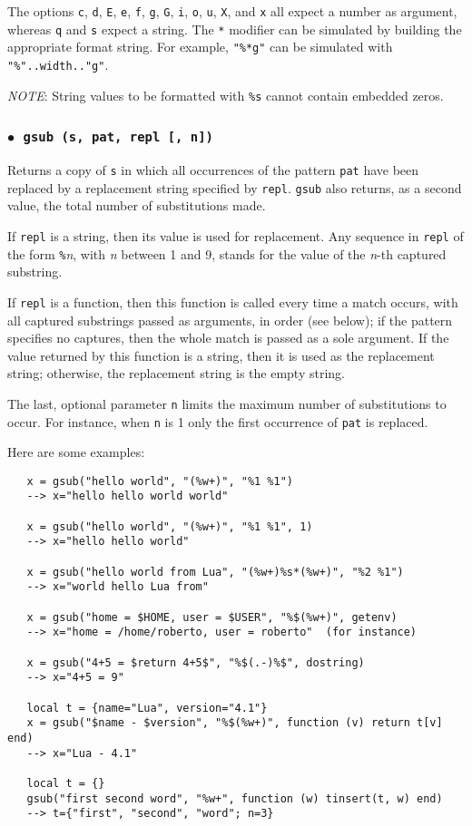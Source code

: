 \documentclass[11pt,twoside,draft]{article}
\makeatletter
\newcommand{\M}[1]{{\rm\emph{#1}}}
\newcommand{\T}[1]{{\tt #1}}
\newcommand{\DefLIB}[1]{\index{#1@{\tt #1}}}
\newcommand{\ff}{$\bullet$\ }
\newcommand{\NOTE}{\par\medskip\noindent\emph{NOTE}: }
\makeatother
\begin{document}
The options \verb|c|, \verb|d|, \verb|E|, \verb|e|, \verb|f|,
\verb|g|, \verb|G|, \verb|i|, \verb|o|, \verb|u|, \verb|X|, and \verb|x| all
expect a number as argument,
whereas \verb|q| and \verb|s| expect a string.
The \verb|*| modifier can be simulated by building
the appropriate format string.
For example, \verb|"%*g"| can be simulated with
\verb|"%"..width.."g"|.

\NOTE
String values to be formatted with
\verb|%s| cannot contain embedded zeros.

\subsubsection*{\ff \T{gsub (s, pat, repl [, n])}}
\DefLIB{gsub}
Returns a copy of \verb|s|
in which all occurrences of the pattern \verb|pat| have been
replaced by a replacement string specified by \verb|repl|.
\verb|gsub| also returns, as a second value,
the total number of substitutions made.

If \verb|repl| is a string, then its value is used for replacement.
Any sequence in \verb|repl| of the form \verb|%|\M{n},
with \M{n} between 1 and 9,
stands for the value of the \M{n}-th captured substring.

If \verb|repl| is a function, then this function is called every time a
match occurs, with all captured substrings passed as arguments,
in order (see below);
if the pattern specifies no captures,
then the whole match is passed as a sole argument.
If the value returned by this function is a string,
then it is used as the replacement string;
otherwise, the replacement string is the empty string.

The last, optional parameter \verb|n| limits
the maximum number of substitutions to occur.
For instance, when \verb|n| is 1 only the first occurrence of
\verb|pat| is replaced.

Here are some examples:
\begin{verbatim}
   x = gsub("hello world", "(%w+)", "%1 %1")
   --> x="hello hello world world"

   x = gsub("hello world", "(%w+)", "%1 %1", 1)
   --> x="hello hello world"

   x = gsub("hello world from Lua", "(%w+)%s*(%w+)", "%2 %1")
   --> x="world hello Lua from"

   x = gsub("home = $HOME, user = $USER", "%$(%w+)", getenv)
   --> x="home = /home/roberto, user = roberto"  (for instance)

   x = gsub("4+5 = $return 4+5$", "%$(.-)%$", dostring)
   --> x="4+5 = 9"

   local t = {name="Lua", version="4.1"}
   x = gsub("$name - $version", "%$(%w+)", function (v) return t[v] end)
   --> x="Lua - 4.1"

   local t = {}
   gsub("first second word", "%w+", function (w) tinsert(t, w) end)
   --> t={"first", "second", "word"; n=3}
\end{verbatim}
\end{document}
